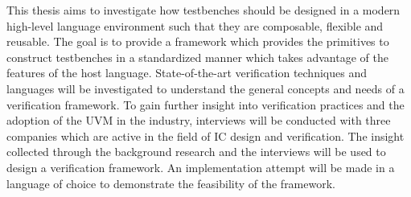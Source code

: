 This thesis aims to investigate how testbenches should be designed in a modern high-level language environment such that they are composable, flexible and reusable. The goal is to provide a framework which provides the primitives to construct testbenches in a standardized manner which takes advantage of the features of the host language. State-of-the-art verification techniques and languages will be investigated to understand the general concepts and needs of a verification framework. To gain further insight into verification practices and the adoption of the UVM in the industry, interviews will be conducted with three companies which are active in the field of IC design and verification. The insight collected through the background research and the interviews will be used to design a verification framework. An implementation attempt will be made in a language of choice to demonstrate the feasibility of the framework.



